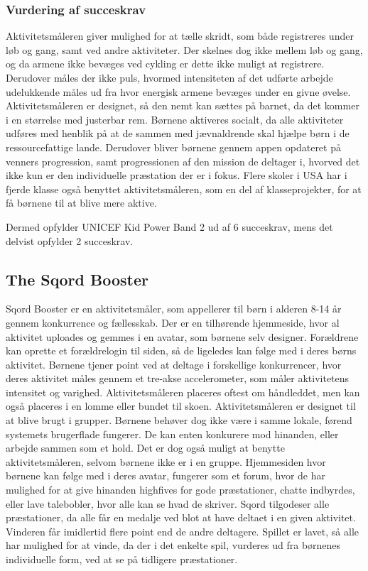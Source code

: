 \subsubsection{Vurdering af succeskrav}
Aktivitetsmåleren giver mulighed for at tælle skridt, som både registreres under løb og gang, samt ved andre aktiviteter. Der skelnes dog ikke mellem løb og gang, og da armene ikke bevæges ved cykling er dette ikke muligt at registrere. Derudover måles der ikke puls, hvormed intensiteten af det udførte arbejde udelukkende måles ud fra hvor energisk armene bevæges under en givne øvelse. Aktivitetsmåleren er designet, så den nemt kan sættes på barnet, da det kommer i en størrelse med justerbar rem.\citep{PowerManual2015} \newline
Børnene aktiveres socialt, da alle aktiviteter udføres med henblik på at de sammen med jævnaldrende skal hjælpe børn i de ressourcefattige lande. Derudover bliver børnene gennem appen opdateret på venners progression, samt progressionen af den mission de deltager i, hvorved det ikke kun er den individuelle præstation der er i fokus. Flere skoler i USA har i fjerde klasse også benyttet aktivitetsmåleren, som en del af klasseprojekter, for at få børnene til at blive mere aktive.\citep{PowerAbout2015}

Dermed opfylder UNICEF Kid Power Band 2 ud af 6 succeskrav, mens det delvist opfylder 2 succeskrav.

\subsection{The Sqord Booster}
Sqord Booster er en aktivitetsmåler, som appellerer til børn i alderen 8-14 år gennem konkurrence og fællesskab. Der er en tilhørende hjemmeside, hvor al aktivitet uploades og gemmes i en avatar, som børnene selv designer. Forældrene kan oprette et forældrelogin til siden, så de ligeledes kan følge med i deres børns aktivitet. Børnene tjener point ved at deltage i forskellige konkurrencer, hvor deres aktivitet måles gennem et tre-akse accelerometer, som måler aktivitetens intensitet og varighed. Aktivitetsmåleren placeres oftest om håndleddet, men kan også placeres i en lomme eller bundet til skoen. \newline
Aktivitetsmåleren er designet til at blive brugt i grupper. Børnene behøver dog ikke være i samme lokale, førend systemets brugerflade fungerer. De kan enten konkurere mod hinanden, eller arbejde sammen som et hold. Det er dog også muligt at benytte aktivitetsmåleren, selvom børnene ikke er i en gruppe. \newline
Hjemmesiden hvor børnene kan følge med i deres avatar, fungerer som et forum, hvor de har mulighed for at give hinanden highfives for gode præstationer, chatte indbyrdes, eller lave talebobler, hvor alle kan se hvad de skriver. \newline
Sqord tilgodeser alle præstationer, da alle får en medalje ved blot at have deltaet i en given aktivitet. Vinderen får imidlertid flere point end de andre deltagere. Spillet er lavet, så alle har mulighed for at vinde, da der i det enkelte spil, vurderes ud fra børnenes individuelle form, ved at se på tidligere præstationer.

